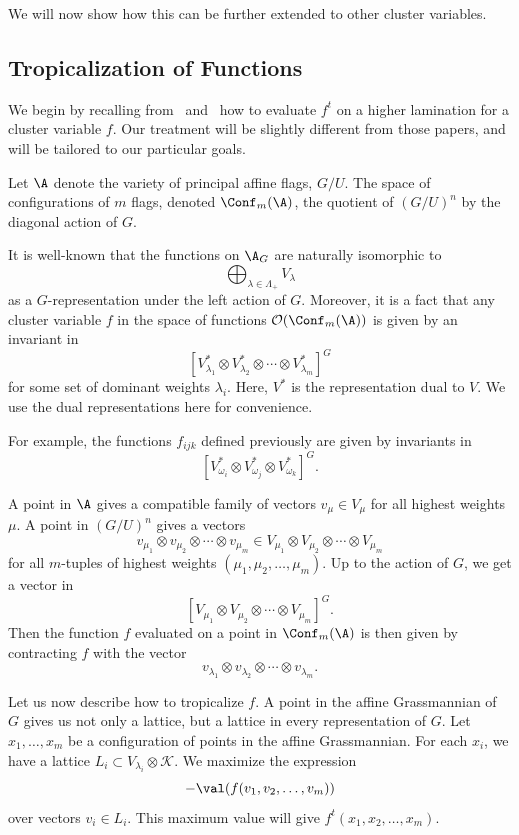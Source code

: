 We will now show how this can be further extended to other cluster variables.

\subsection{Tropicalization of Functions}

We begin by recalling from~\cite{GS} and~\cite{Le} how to evaluate $f^t$ on a higher lamination for a cluster variable $f$. Our treatment will be slightly different from those papers, and will be tailored to our particular goals.

Let $\A$ denote the variety of principal affine flags, $G/U$. The space of configurations of $m$ flags, denoted $\Conf_m (\A)$, the quotient of $(G/U)^n$ by the diagonal action of $G$. 

It is well-known that the functions on $\A_G$ are naturally isomorphic to 
\[
\bigoplus_{\lambda \in \Lambda_+} V_{\lambda}
\]
as a $G$-representation under the left action of $G$. Moreover, it is a fact that any cluster variable $f$ in the space of functions $\mathcal{O}(\Conf_m (\A))$ is given by an invariant in
\[
[V_{\lambda_1}^* \otimes V_{\lambda_2}^* \otimes \cdots \otimes V_{\lambda_m}^*]^G
\]
for some set of dominant weights $\lambda_i$. Here, $V^*$ is the representation dual to $V$. We use the dual representations here for convenience.

For example, the functions $f_{ijk}$ defined previously are given by invariants in 
\[
[V_{\omega_i}^* \otimes V_{\omega_j}^* \otimes V_{\omega_k}^*]^G.
\]

A point in $\A$ gives a compatible family of vectors $v_{\mu} \in V_{\mu}$ for all highest weights $\mu$. A point in $(G/U)^n$ gives a vectors 
\[
v_{\mu_1} \otimes v_{\mu_2} \otimes \cdots \otimes v_{\mu_m} \in V_{\mu_1} \otimes V_{\mu_2} \otimes \cdots \otimes V_{\mu_m}
\]
for all $m$-tuples of highest weights $(\mu_1, \mu_2, \dots, \mu_m)$. Up to the action of $G$, we get a vector in
\[
[V_{\mu_1} \otimes V_{\mu_2} \otimes \cdots \otimes V_{\mu_m}]^G.
\]
Then the function $f$ evaluated on a point in $\Conf_m (\A)$ is then given by contracting $f$ with the vector 
\[
v_{\lambda_1} \otimes v_{\lambda_2} \otimes \cdots \otimes v_{\lambda_m}.
\]

Let us now describe how to tropicalize $f$. 
A point in the affine Grassmannian of $G$ gives us not only a lattice, but a lattice in every representation of $G$. Let $x_1, \dots, x_m$ be a configuration of points in the affine Grassmannian. For each $x_i$, we have a lattice $L_i \subset V_{\lambda_i} \otimes \mathcal{K}$. We maximize the expression
\[
-\val(f(v_1, v_2, \dots, v_m))
\]
over vectors $v_i \in L_i$. This maximum value will give $f^t(x_1, x_2, \dots, x_m)$.

